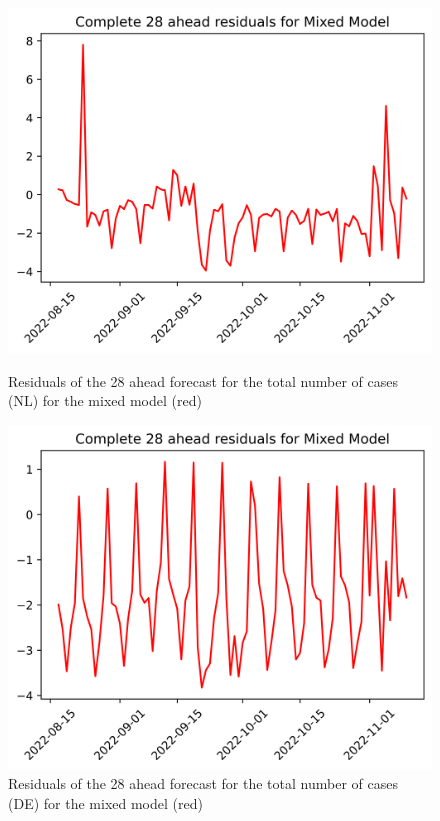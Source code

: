 \begin{figure}

\begin{minipage}{.45\textwidth}
  \centering
  \includegraphics[width=\linewidth]{pics/28_ah/28_ahead_errors_Mixed Model.png}
  \caption{Residuals of the 28 ahead forecast for the total number of cases (NL) for the mixed model (red)}
  \label{fig:tot_cases_error_28_mix}
\end{minipage}
\begin{minipage}{.45\textwidth}
  \centering
  \includegraphics[width=\linewidth]{pics/28_ah/DE_28_ahead_errors_Mixed Model.png}
  \caption{Residuals of the 28 ahead forecast for the total number of cases (DE) for the mixed model (red)}
  \label{fig:tot_cases_error_28_mix_DE}
\end{minipage}

\end{figure}


